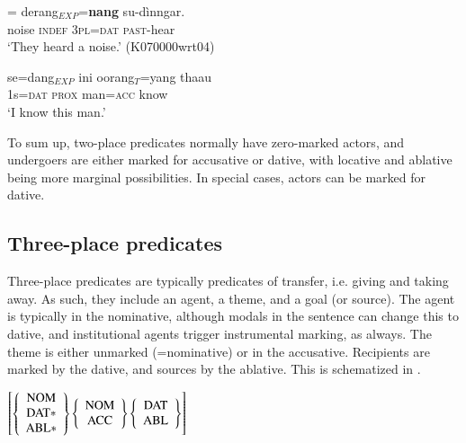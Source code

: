\documentclass[a4paper,10pt]{article}
\begin{document}
\ea\label{ex:val:2:datnom}
=\zero{}  derang$_{EXP}$=\textbf{nang}   su-dìnngar. \\
     noise \textsc{indef} \textsc{3pl}=\textsc{dat} \textsc{past}-hear  \\
    `They heard a noise.' (K070000wrt04)
\z

\ea\label{ex:val:2:datacc}
\gll se=dang$_{EXP}$ ini oorang$_{T}$=yang thaau\\
1s=\textsc{dat} \textsc{prox} man=\textsc{acc} know \\
`I know this man.'
\z




To sum up, two-place predicates normally have zero-marked actors, and undergoers are either marked for accusative or dative, with locative and ablative being more marginal possibilities. In special cases, actors can be marked for dative. 



\subsection{Three-place predicates}\label{sec:argstr:Three-placepredicates}
Three-place predicates are typically predicates of transfer, i.e. giving and taking away. As such, they include an agent, a theme, and a goal (or source). The agent is typically in the nominative, although modals in the sentence can change this to dative, and institutional agents trigger instrumental marking, as always.  The theme is either unmarked (=nominative) or in the accusative. Recipients are marked by the dative, and sources by the ablative. This is schematized in .


\ea \label{ex:threeplaceschema}
$
\left[
\left\{\begin{array}{c}\rm NOM \\ \rm DAT*\\ \rm ABL* \end{array}\right\}
\left\{\begin{array}{c}\rm NOM \\ \rm ACC  \end{array}\right\}
\left\{\begin{array}{c}\rm DAT \\ \rm ABL  \end{array}\right\}
\right]
$
\z
\end{document}
